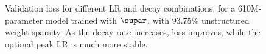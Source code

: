 \begin{figure}
  \centering
  \scalebox{0.3}{
    \texttt{[image: pdffigs/s=0.9375\_curves.617M.pdf]}
  }
  \mbox{}
  \vspace{-4mm}
  \mbox{}
  \caption{Validation loss for different LR and decay combinations,
    for a 610M-parameter model trained with $\supar$, with 93.75\%
    unstructured weight sparsity.  As the decay rate increases, loss
    improves, while the optimal peak LR is much more
    stable.\label{fig:maxlr_s=0.9375.heatmap}}
\end{figure}
